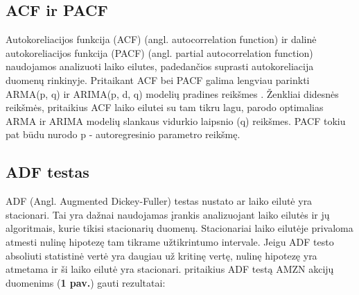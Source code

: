 \documentclass{VUMIFInfKursinis}
\begin{document}
\subsection {ACF ir PACF}
Autokoreliacijos funkcija (ACF) (angl. autocorrelation function) ir dalinė autokoreliacijos funkcija (PACF) (angl. partial autocorrelation function) naudojamos analizuoti laiko eilutes,
padedančios suprasti autokoreliacija duomenų rinkinyje. Pritaikant ACF bei PACF galima lengviau parinkti ARMA(p, q) ir ARIMA(p, d, q) modelių pradines reikšmes \cite{abu2017autoregressive}.
Ženkliai didesnės reikšmės, pritaikius ACF laiko eilutei su tam tikru lagu, parodo optimalias ARMA ir ARIMA modelių slankaus vidurkio laipsnio (q) reikšmes. 
PACF tokiu pat būdu nurodo p - autoregresinio parametro reikšmę. 

\subsection{ADF testas}
ADF (Angl. Augmented Dickey-Fuller) testas nustato ar laiko eilutė yra stacionari. Tai yra dažnai naudojamas įrankis analizuojant laiko eilutės ir jų algoritmais, kurie tikisi stacionarių 
duomenų\cite{chi2018stock}. Stacionariai laiko eilutėje privaloma atmesti nulinę hipotezę tam tikrame užtikrintumo intervale. 
Jeigu ADF testo absoliuti statistinė vertė yra daugiau už kritinę vertę, nulinę hipotezę yra atmetama ir ši laiko eilutė yra stacionari.
pritaikius ADF testą{\cite{seabold2010statsmodels}} AMZN akcijų duomenims (\textbf{1 pav.}) gauti rezultatai:
\end{document}
